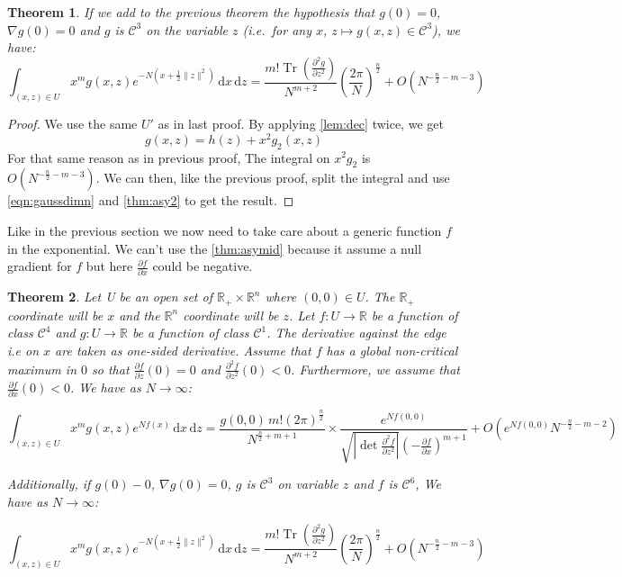 \documentclass[10pt]{report}
\theoremstyle{plain}
\newtheorem{thm}{Theorem}[chapter]
\theoremstyle{definition}
\theoremstyle{remark}
\newcommand{\R}{\ensuremath{\mathbb{R}}}
\newcommand{\dd}{\mathrm{d}}
\newcommand{\dpar}[2]{\frac{\partial{#1}}{\partial{#2}}}
\newcommand{\dparn}[3]{\frac{\partial^{#3} {#1}}{\partial{#2}^{#3}}}
\DeclareMathOperator{\Tr}{Tr}
\newcommand{\class}[1]{{\mathscr{C}^{#1}}}
\begin{document}
\begin{thm}\label{thm:asyp2}
  If we add to the previous theorem the hypothesis that $g(0) = 0$, $\nabla g(0) =
  0$ and $g$ is $\class 3$ on the
  variable $z$ (i.e.\ for any $x$, $z \mapsto g(x,z) \in \class 3$), we have:
  \[\int_{(x,z) \in U} x^m g(x,z)e^{-N(x + \frac 12 \|z\|^2)} \,\dd x\, \dd z
    = \frac{m!\Tr\left(\dparn g z 2\right)}{N^{m+2}}
    {\left(\frac {2\pi}{N}\right)}^{\frac n 2}
    + O\left({N^{-\frac n 2 -m -3}}\right)\]
\end{thm}

\begin{proof}
  We use the same $U'$ as in last proof.
  By applying \cref{lem:dec} twice, we get
  \[g(x,z) = h(z) + x^2g_2(x,z)\]
  For that same reason as in previous proof, The integral on $x^2g_2$ is
  $O(N^{-\frac n2 - m - 3})$. We can then, like the previous proof, split the
  integral and use \cref{eqn:gaussdimn} and \cref{thm:asy2} to get the result.
\end{proof}

Like in the previous section we now need to take care about a generic function
$f$ in the exponential. We can't use the \cref{thm:asymid} because it assume a
null gradient for $f$ but here $\dpar f x$ could be negative.

\begin{thm}\label{thm:asypmid}
   Let U be an open set of $\R_+ \times \R^n$ where $(0,0) \in U$. The $\R_+$
  coordinate will be $x$ and the $\R^n$ coordinate will be $z$. Let $f:U \to \R$
  be a function of class $\class 4$ and $g : U \to
  \R$ be a function of class $\class 1$. The derivative against the edge i.e on $x$ are
  taken as one-sided derivative. Assume that $f$ has a global non-critical
  maximum in $0$ so that $\dpar f z(0) = 0$ and $\dparn f z 2(0) < 0$. Furthermore, we
  assume that $\dpar f x(0) < 0$. We have as $N \to \infty$:

  \[\int_{(x,z) \in U} x^m g(x,z)e^{Nf(x)} \,\dd x\, \dd z =
    \frac{g(0,0)\,m! {(2\pi)}^{\frac n 2}}{N^{\frac n 2 + m + 1}} \times
    \frac{e^{Nf(0,0)}}{\sqrt{\left|\det \dparn f z 2\right|} \left(-\dpar f x\right)^{m+1}} + O(e^{Nf(0,0)}N^{-\frac n 2 - m - 2})\]

  Additionally, if $g(0) - 0$, $\nabla g(0) = 0$, $g$ is $\class 3$ on
  variable $z$ and $f$ is $\class 6$, We have as $N \to \infty$:

   \[\int_{(x,z) \in U} x^m g(x,z)e^{-N(x + \frac 12 \|z\|^2)} \,\dd x\, \dd z
    = \frac{m!\Tr\left(\dparn g z 2\right)}{N^{m+2}}
    {\left(\frac {2\pi}{N}\right)}^{\frac n 2}
    + O\left({N^{-\frac n 2 -m -3}}\right)\]
\end{thm}
\end{document}
